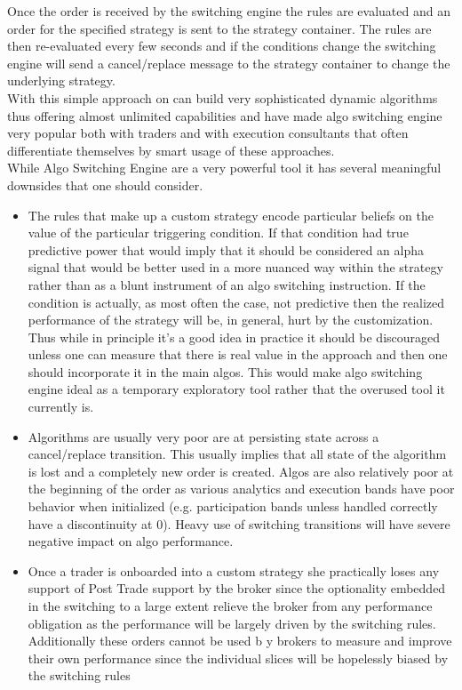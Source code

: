 Once the order is received by the switching engine the rules are evaluated and an order for the specified strategy is sent to the strategy container. The rules are then re-evaluated every few seconds and if the conditions change the switching engine will send a cancel/replace message to the strategy container to change the underlying strategy. \\

With this simple approach on can build very sophisticated dynamic algorithms thus offering almost unlimited capabilities and have made algo switching engine very popular both with traders and with execution consultants that often differentiate themselves by smart usage of these approaches. \\
While Algo Switching Engine are a very powerful tool it has several meaningful downsides that one should consider.
\begin{itemize}
\item The rules that make up a custom strategy encode particular beliefs on the value of the particular triggering condition. If that condition had true predictive power that would imply that it should be considered an alpha signal that would be better used in a more nuanced way within the strategy rather than as a blunt instrument of an algo switching instruction. If the condition is actually, as most often the case, not predictive then the realized performance of the strategy will be, in general, hurt by the customization. Thus while in principle it's a good idea in practice it should be discouraged unless one can measure that there is real value in the approach and then one should incorporate it in the main algos. This would make algo switching engine ideal as a temporary exploratory tool rather that the overused tool it currently is.
\item  Algorithms are usually very poor are at persisting state across a cancel/replace transition. This usually implies that all state of the algorithm is lost and a completely new order is created. Algos are also relatively poor at the beginning of the order as various analytics and execution bands have poor behavior when initialized (e.g. participation bands unless handled correctly have a discontinuity at 0). Heavy use of switching transitions will have severe negative impact on algo performance.
\item Once a trader is onboarded into a custom strategy she practically loses any support of Post Trade support by the broker since the optionality embedded in the switching to a large extent relieve the broker from any performance obligation as the performance will be largely driven by the switching rules. Additionally these orders cannot be used b y brokers to measure and improve their own performance since the individual slices will be hopelessly biased by the switching rules
\end{itemize}

